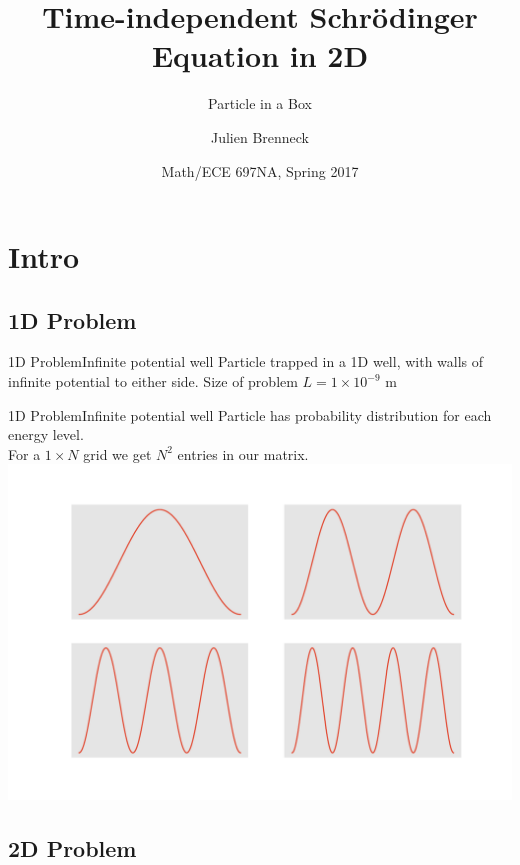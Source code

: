 \documentclass[mathserif]{beamer}
\title{Time-independent Schrödinger Equation in 2D}
\subtitle{Particle in a Box}
\author{Julien Brenneck}
\date{Math/ECE 697NA, Spring 2017}
\begin{document}
\begin{frame}
  \titlepage
\end{frame}



\section{Intro}

\subsection{1D Problem}

\begin{frame}{1D Problem}{Infinite potential well}
  Particle trapped in a 1D well, with walls of infinite potential to either side. Size of problem $L=1 \times 10^{-9}$ m \\
    \begin{figure}
    \centering
    \def\svgwidth{15em}
    
    \end{figure}
\end{frame}

\begin{frame}{1D Problem}{Infinite potential well}
  Particle has probability distribution for each energy level. \\
  For a $1 \times N$ grid we get $N^2$ entries in our matrix. \\
  \center \includegraphics[scale=0.4]{1dp.pdf}
\end{frame}

\subsection{2D Problem}
\end{document}
